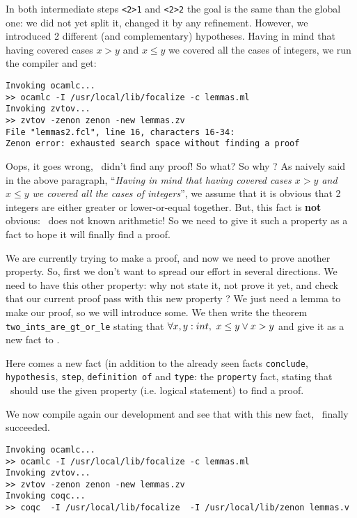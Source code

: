 \documentclass[11pt,a4paper,twoside,onecolumn,fullpage]{article}
\begin{document}
In both intermediate steps \lstinline"<2>1" and \lstinline"<2>2" the
goal is the same than the global one: we did not yet split it, changed
it by any refinement. However, we introduced 2 different (and
complementary) hypotheses.
Having in mind that having covered cases $x > y$
and  $x \le y$ we covered all the cases of integers, we run the
compiler and get:

{\scriptsize
\begin{verbatim}
Invoking ocamlc...
>> ocamlc -I /usr/local/lib/focalize -c lemmas.ml
Invoking zvtov...
>> zvtov -zenon zenon -new lemmas.zv
File "lemmas2.fcl", line 16, characters 16-34:
Zenon error: exhausted search space without finding a proof
\end{verbatim}}

Oops, it goes wrong, \zenon\ didn't find any proof! So what? So why ?
As naively said in the above paragraph, ``{\em Having in mind that having
covered cases $x > y$ and  $x \le y$ we covered all the cases of
integers}'', we assume that it is obvious that 2 integers are either
greater or lower-or-equal together. But, this fact is {\bf not}
obvious: \zenon\ does not known arithmetic! So we need to give it
such a property as a fact to hope it will finally find a proof.

\medskip
We are currently trying to make a proof, and now we need to prove
another property. So, first we don't want to spread our effort in
several directions. We need to have this other property: why not state
it, not prove it yet, and check that our current proof pass with this
new property ? We just need a lemma to make our proof, so we will
introduce some. We then write the theorem
\lstinline"two_ints_are_gt_or_le"
stating that $\forall x, y : int,\ x \le y \vee x > y$ and give it
as a new fact to \zenon.

Here comes a new fact  (in addition to the
already seen facts \lstinline"conclude", \lstinline"hypothesis",
\lstinline"step", \lstinline"definition of" and \lstinline"type": the
\lstinline"property" fact, sta\-ting that \zenon\ should use the given
property (i.e. logical statement) to find a proof.

{\scriptsize
}

We now compile again our development and see that with this new fact,
\zenon\ finally succeeded.

{\scriptsize
\begin{verbatim}
Invoking ocamlc...
>> ocamlc -I /usr/local/lib/focalize -c lemmas.ml
Invoking zvtov...
>> zvtov -zenon zenon -new lemmas.zv
Invoking coqc...                                                
>> coqc  -I /usr/local/lib/focalize  -I /usr/local/lib/zenon lemmas.v
\end{verbatim}}
\end{document}
